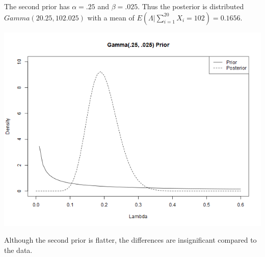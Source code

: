 \documentclass{article}
\begin{document}
The second prior has $\alpha = .25$ and $\beta = .025$. Thus the posterior is distributed $Gamma(20.25, 102.025)$ with a mean of $E(\Lambda|\sum_{i=1}^{20} X_i = 102) = 0.1656$.

\includegraphics[scale = .5]{output/Problem62Plot_b.png}

Although the second prior is flatter, the differences are insignificant compared to the data.
\end{document}
